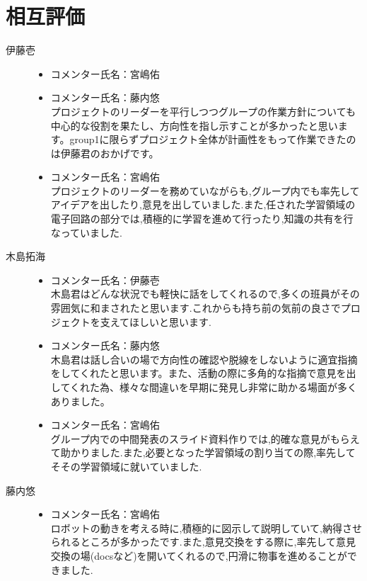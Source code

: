 \section{相互評価}
\begin{description}
   \item[伊藤壱]\mbox{}
      \begin{itemize}
       \item コメンター氏名：宮嶋佑\\
        \item コメンター氏名：藤内悠\\プロジェクトのリーダーを平行しつつグループの作業方針についても中心的な役割を果たし、方向性を指し示すことが多かったと思います。group1に限らずプロジェクト全体が計画性をもって作業できたのは伊藤君のおかげです。
 \item  コメンター氏名：宮嶋佑\\プロジェクトのリーダーを務めていながらも,グループ内でも率先してアイデアを出したり,意見を出していました.また,任された学習領域の電子回路の部分では,積極的に学習を進めて行ったり,知識の共有を行なっていました.\\
      \end{itemize}
         \item[木島拓海]\mbox{}
      \begin{itemize}
             \item コメンター氏名：伊藤壱\\
             木島君はどんな状況でも軽快に話をしてくれるので,多くの班員がその雰囲気に和まされたと思います.これからも持ち前の気前の良さでプロジェクトを支えてほしいと思います.
        \item コメンター氏名：藤内悠\\木島君は話し合いの場で方向性の確認や脱線をしないように適宜指摘をしてくれたと思います。また、活動の際に多角的な指摘で意見を出してくれた為、様々な間違いを早期に発見し非常に助かる場面が多くありました。
 \item  コメンター氏名：宮嶋佑\\グループ内での中間発表のスライド資料作りでは,的確な意見がもらえて助かりました.また,必要となった学習領域の割り当ての際,率先してそその学習領域に就いていました.\\
      \end{itemize}
         \item[藤内悠]\mbox{}
      \begin{itemize}
 \item  コメンター氏名：宮嶋佑\\ロボットの動きを考える時に,積極的に図示して説明していて,納得させられるところが多かったです.また,意見交換をする際に,率先して意見交換の場(docsなど)を開いてくれるので,円滑に物事を進めることができました.\\

\end{itemize}
\end{description}
